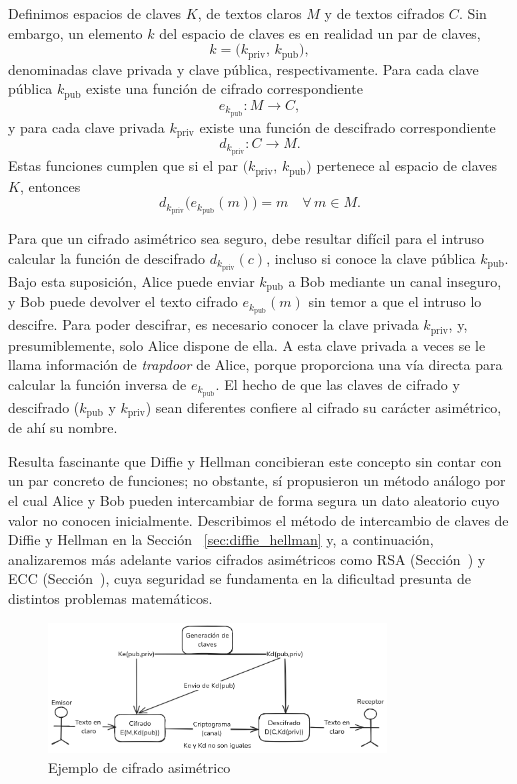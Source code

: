 Definimos espacios de claves \(K\), de textos claros \(M\) y de textos cifrados \(C\). Sin embargo, un elemento \(k\) del espacio de claves es en realidad un par de claves,
\[
k = \bigl(k_{\text{priv}},\,k_{\text{pub}}\bigr),
\]
denominadas clave privada y clave pública, respectivamente. Para cada clave pública \(k_{\text{pub}}\) existe una función de cifrado correspondiente
\[
e_{k_{\text{pub}}}: M \longrightarrow C,
\]
y para cada clave privada \(k_{\text{priv}}\) existe una función de descifrado correspondiente
\[
d_{k_{\text{priv}}}: C \longrightarrow M.
\]
Estas funciones cumplen que si el par \(\bigl(k_{\text{priv}},\,k_{\text{pub}}\bigr)\) pertenece al espacio de claves \(K\), entonces
\[
d_{k_{\text{priv}}}\bigl(e_{k_{\text{pub}}}(m)\bigr) = m
\quad\forall\,m \in M.
\]

Para que un cifrado asimétrico sea seguro, debe resultar difícil para el intruso calcular la función de descifrado \(d_{k_{\text{priv}}}(c)\), incluso si conoce la clave pública \(k_{\text{pub}}\). Bajo esta suposición, Alice puede enviar \(k_{\text{pub}}\) a Bob mediante un canal inseguro, y Bob puede devolver el texto cifrado \(e_{k_{\text{pub}}}(m)\) sin temor a que el intruso lo descifre. Para poder descifrar, es necesario conocer la clave privada \(k_{\text{priv}}\), y, presumiblemente, solo Alice dispone de ella. A esta clave privada a veces se le llama información de \emph{trapdoor} de Alice, porque proporciona una vía directa para calcular la función inversa de \(e_{k_{\text{pub}}}\). El hecho de que las claves de cifrado y descifrado (\(k_{\text{pub}}\) y \(k_{\text{priv}}\)) sean diferentes confiere al cifrado su carácter asimétrico, de ahí su nombre.

Resulta fascinante que Diffie y Hellman concibieran este concepto sin contar con un par concreto de funciones; no obstante, sí propusieron un método análogo por el cual Alice y Bob pueden intercambiar de forma segura un dato aleatorio cuyo valor no conocen inicialmente. Describimos el método de intercambio de claves de Diffie y Hellman en la Sección ~\ref{sec:diffie_hellman} y, a continuación, analizaremos más adelante varios cifrados asimétricos como RSA (Sección~) y ECC (Sección~), cuya seguridad se fundamenta en la dificultad presunta de distintos problemas matemáticos.

\begin{figure}[H]
    \centering
    \includegraphics[width=0.8\textwidth]{imagenes/Cifrado_asimetrico.png}
    \caption{Ejemplo de cifrado asimétrico}
    \label{fig:cifrado_asimetrico}
\end{figure}

